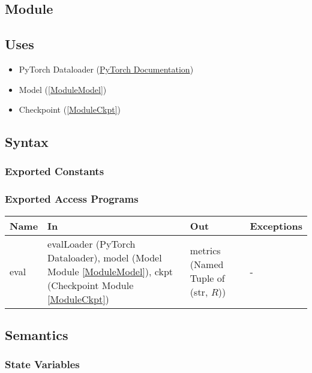 \documentclass[12pt, titlepage]{article}
\begin{document}
\subsection{Module}



\subsection{Uses}
\begin{itemize}
  \item PyTorch Dataloader (\href{https://pytorch.org/tutorials/beginner/basics/data_tutorial.html}{PyTorch Documentation})
  \item Model (\ref{ModuleModel})
  \item Checkpoint (\ref{ModuleCkpt})
\end{itemize}


\subsection{Syntax}



\subsubsection{Exported Constants}



\subsubsection{Exported Access Programs}

\begin{center}
  \begin{tabular}{p{2cm}|p{6cm}|p{2cm}|p{2cm}}
  \hline
  \textbf{Name} & \textbf{In} & \textbf{Out} & \textbf{Exceptions} \\
  \hline
  eval & evalLoader (PyTorch Dataloader), model (Model Module \ref{ModuleModel}), ckpt (Checkpoint Module \ref{ModuleCkpt}) & metrics (Named Tuple of (str, $R$)) & - \\
  \hline
  \end{tabular}
\end{center}

\subsection{Semantics}

\subsubsection{State Variables}
\end{document}
